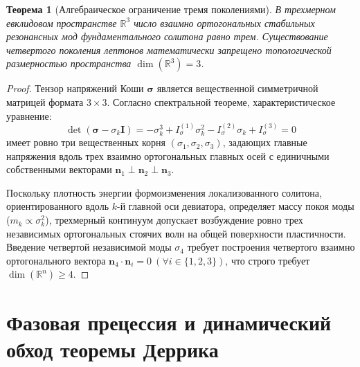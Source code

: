 \documentclass[12pt,a4paper]{article}
\newtheorem{theorem}{Теорема}
\begin{document}
	\begin{theorem}[Алгебраическое ограничение тремя поколениями]
		В трехмерном евклидовом пространстве $\mathbb{R}^3$ число взаимно ортогональных стабильных резонансных мод фундаментального солитона равно трем. Существование четвертого поколения лептонов математически запрещено топологической размерностью пространства $\dim(\mathbb{R}^3) = 3$.
	\end{theorem}
	
	\begin{proof}
		Тензор напряжений Коши $\boldsymbol{\sigma}$ является вещественной симметричной матрицей формата $3 \times 3$. Согласно спектральной теореме, характеристическое уравнение:
		\begin{equation}
			\det(\boldsymbol{\sigma} - \sigma_k \mathbf{I}) = -\sigma_k^3 + I_\sigma^{(1)} \sigma_k^2 - I_\sigma^{(2)} \sigma_k + I_\sigma^{(3)} = 0
		\end{equation}
		имеет ровно три вещественных корня $(\sigma_1, \sigma_2, \sigma_3)$, задающих главные напряжения вдоль трех взаимно ортогональных главных осей с единичными собственными векторами $\mathbf{n}_1 \perp \mathbf{n}_2 \perp \mathbf{n}_3$.
		
		Поскольку плотность энергии формоизменения локализованного солитона, ориентированного вдоль $k$-й главной оси девиатора, определяет массу покоя моды ($m_k \propto \sigma_k^2$), трехмерный континуум допускает возбуждение ровно трех независимых ортогональных стоячих волн на общей поверхности пластичности. Введение четвертой независимой моды $\sigma_4$ требует построения четвертого взаимно ортогонального вектора $\mathbf{n}_4 \cdot \mathbf{n}_i = 0 \ (\forall i \in \{1,2,3\})$, что строго требует $\dim(\mathbb{R}^n) \ge 4$.
	\end{proof}
	
	\section{Фазовая прецессия и динамический обход теоремы Деррика}
	
\end{document}
